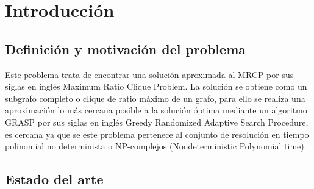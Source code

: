 
\chapter{Introducción} %

\label{Chapter1}


\newcommand{\keyword}[1]{\textbf{#1}}
\newcommand{\tabhead}[1]{\textbf{#1}}
\newcommand{\code}[1]{\texttt{#1}}
\newcommand{\file}[1]{\texttt{\bfseries#1}}
\newcommand{\option}[1]{\texttt{\itshape#1}}
\newcommand{\Mod}[1]{\ (\mathrm{mod}\ #1)}


\section{Definición y motivación del problema}
Este problema trata de encontrar una solución aproximada al MRCP por sus siglas en inglés Maximum Ratio Clique Problem. La solución se obtiene como un subgrafo completo o clique de ratio máximo de un grafo, para ello se realiza una aproximación lo más cercana posible a la solución óptima mediante un algoritmo GRASP por sus siglas en inglés Greedy Randomized Adaptive Search Procedure, es cercana ya que se este problema pertenece al conjunto de resolución en tiempo polinomial no determinista o NP-complejos (Nondeterministic Polynomial time).

\section{Estado del arte}



